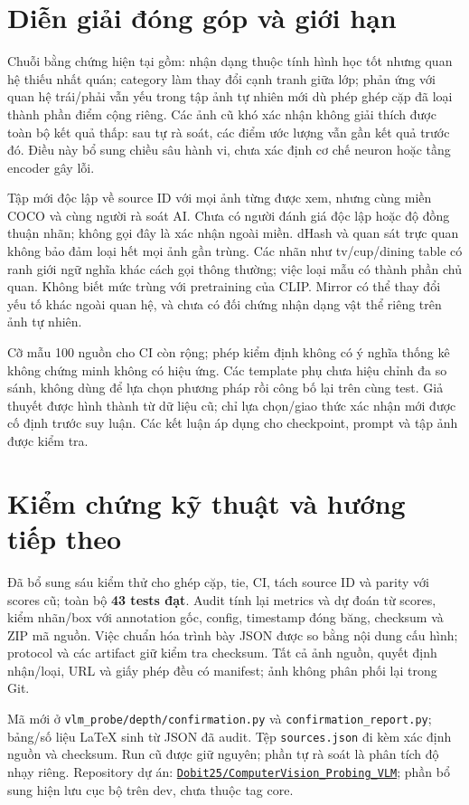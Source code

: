 \documentclass[11pt,a4paper]{article}
\begin{document}
\section{Diễn giải đóng góp và giới hạn}
Chuỗi bằng chứng hiện tại gồm: nhận dạng thuộc tính hình học tốt nhưng quan hệ thiếu nhất quán; category làm thay đổi cạnh tranh giữa lớp; phản ứng với quan hệ trái/phải vẫn yếu trong tập ảnh tự nhiên mới dù phép ghép cặp đã loại thành phần điểm cộng riêng. Các ảnh cũ khó xác nhận không giải thích được toàn bộ kết quả thấp: sau tự rà soát, các điểm ước lượng vẫn gần kết quả trước đó. Điều này bổ sung chiều sâu hành vi, chưa xác định cơ chế neuron hoặc tầng encoder gây lỗi.

Tập mới độc lập về source ID với mọi ảnh từng được xem, nhưng cùng miền COCO và cùng người rà soát AI. Chưa có người đánh giá độc lập hoặc độ đồng thuận nhãn; không gọi đây là xác nhận ngoài miền. dHash và quan sát trực quan không bảo đảm loại hết mọi ảnh gần trùng. Các nhãn như tv/cup/dining table có ranh giới ngữ nghĩa khác cách gọi thông thường; việc loại mẫu có thành phần chủ quan. Không biết mức trùng với pretraining của CLIP. Mirror có thể thay đổi yếu tố khác ngoài quan hệ, và chưa có đối chứng nhận dạng vật thể riêng trên ảnh tự nhiên.

Cỡ mẫu 100 nguồn cho CI còn rộng; phép kiểm định không có ý nghĩa thống kê không chứng minh không có hiệu ứng. Các template phụ chưa hiệu chỉnh đa so sánh, không dùng để lựa chọn phương pháp rồi công bố lại trên cùng test. Giả thuyết được hình thành từ dữ liệu cũ; chỉ lựa chọn/giao thức xác nhận mới được cố định trước suy luận. Các kết luận áp dụng cho checkpoint, prompt và tập ảnh được kiểm tra.

\section{Kiểm chứng kỹ thuật và hướng tiếp theo}
Đã bổ sung sáu kiểm thử cho ghép cặp, tie, CI, tách source ID và parity với scores cũ; toàn bộ \textbf{43 tests đạt}. Audit tính lại metrics và dự đoán từ scores, kiểm nhãn/box với annotation gốc, config, timestamp đóng băng, checksum và ZIP mã nguồn. Việc chuẩn hóa trình bày JSON được so bằng nội dung cấu hình; protocol và các artifact giữ kiểm tra checksum. Tất cả ảnh nguồn, quyết định nhận/loại, URL và giấy phép đều có manifest; ảnh không phân phối lại trong Git.

Mã mới ở \texttt{vlm\_probe/depth/confirmation.py} và \texttt{confirmation\_report.py}; bảng/số liệu LaTeX sinh từ JSON đã audit. Tệp \texttt{sources.json} đi kèm xác định nguồn và checksum. Run cũ được giữ nguyên; phần tự rà soát là phân tích độ nhạy riêng. Repository dự án: \href{https://github.com/Dobit25/ComputerVision_Probing_VLM}{\texttt{Dobit25/ComputerVision\_Probing\_VLM}}; phần bổ sung hiện lưu cục bộ trên dev, chưa thuộc tag core.
\end{document}
